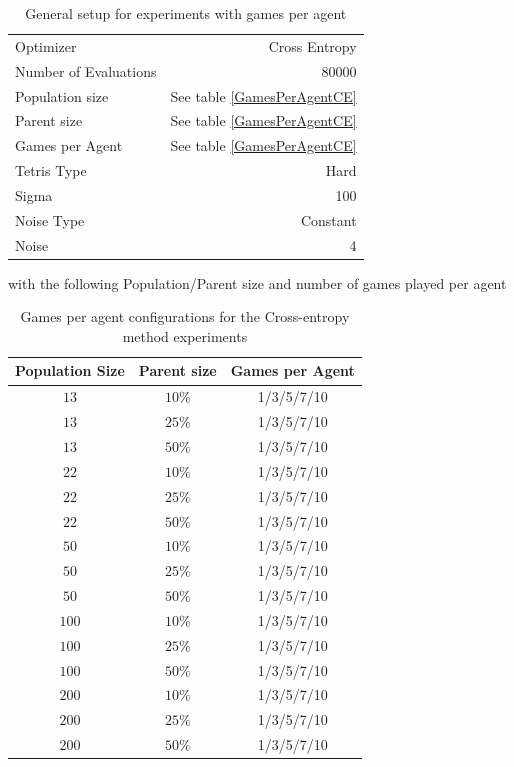 \begin{table}[h]
\centering
\begin{tabular}{l r}
Optimizer & Cross Entropy\\
Number of Evaluations & 80000\\
Population size & See table \ref{GamesPerAgentCE}\\
Parent size & See table \ref{GamesPerAgentCE}\\
Games per Agent & See table \ref{GamesPerAgentCE}\\
Tetris Type & Hard\\
\hline
Sigma & 100\\
Noise Type & Constant\\
Noise & 4
\end{tabular}
\caption{General setup for experiments with games per agent}
\end{table}

with the following Population/Parent size and number of games played per agent


\begin{table}[H]
\centering
\begin{tabular}{c c c}
Population Size & Parent size & Games per Agent\\
\hline
$13$ & $10\%$ & 1/3/5/7/10\\
$13$ & $25\%$ & 1/3/5/7/10\\
$13$ & $50\%$ & 1/3/5/7/10\\
$22$ & $10\%$ & 1/3/5/7/10\\
$22$ & $25\%$ & 1/3/5/7/10\\
$22$ & $50\%$ & 1/3/5/7/10\\
$50$ & $10\%$ & 1/3/5/7/10\\
$50$ & $25\%$ & 1/3/5/7/10\\
$50$ & $50\%$ & 1/3/5/7/10\\
$100$ & $10\%$ & 1/3/5/7/10\\
$100$ & $25\%$ & 1/3/5/7/10\\
$100$ & $50\%$ & 1/3/5/7/10\\
$200$ & $10\%$ & 1/3/5/7/10\\
$200$ & $25\%$ & 1/3/5/7/10\\
$200$ & $50\%$ & 1/3/5/7/10
\end{tabular}
\caption{Games per agent configurations for the Cross-entropy method experiments}
\end{table}

\clearpage

